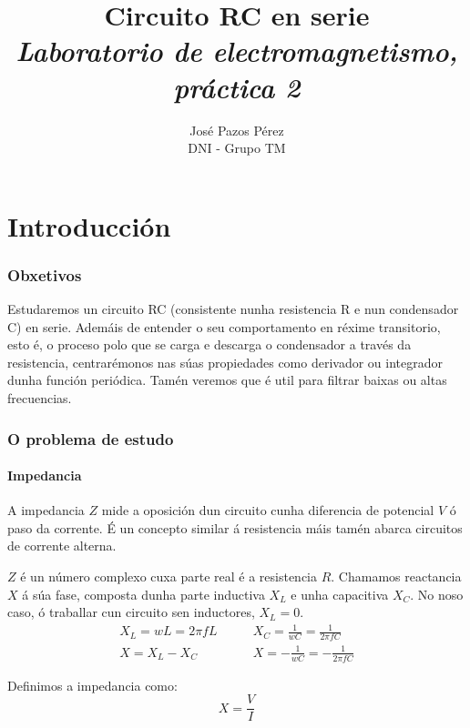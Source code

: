 \documentclass[12pt, a4paper, titlepage]{article}
\title{\textbf{\Huge Circuito RC en serie}\\\textbf{\large \textit{Laboratorio de electromagnetismo, práctica 2}}}
\author{{\Large José Pazos Pérez}\\DNI - Grupo TM}
\date{}
\begin{document}
  \maketitle

  
  \tableofcontents


  \newpage
  \part{Introducción}

    \section{Obxetivos}

    Estudaremos un circuito RC (consistente nunha resistencia R e nun condensador C) en serie.
    Ademáis de entender o seu comportamento en réxime transitorio, esto é, o proceso polo que se carga e descarga o condensador a través da resistencia,
    centrarémonos nas súas propiedades como derivador ou integrador dunha función periódica.
    Tamén veremos que é util para filtrar baixas ou altas frecuencias.

    \section{O problema de estudo}

      \subsection{Impedancia}

      A impedancia $Z$ mide a oposición dun circuito cunha diferencia de potencial $V$ ó paso da corrente.
      É un concepto similar á resistencia máis tamén abarca circuitos de corrente alterna.

      $Z$ é un número complexo cuxa parte real é a resistencia $R$.
      Chamamos reactancia $X$ á súa fase, composta dunha parte inductiva $X_L$ e unha capacitiva $X_C$. No noso caso, ó traballar cun circuito sen inductores, $X_L = 0$.
      \begin{align*}
        X_L = wL = 2 \pi f L \quad & \quad X_C = \frac{1}{wC} = \frac{1}{2 \pi f C} \\
        X = X_L - X_C \quad & \quad X = - \frac{1}{wC} = - \frac{1}{2 \pi f C}
      \end{align*}

      Definimos a impedancia como:
      \begin{equation} \label{ec:impedancia}
        X = \frac{V}{I}
      \end{equation}
\end{document}
